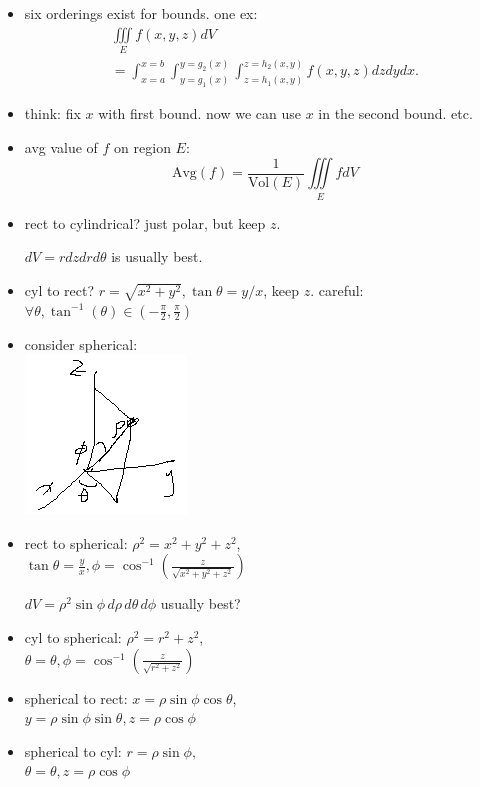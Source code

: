 \documentclass[11pt]{article}
\theoremstyle{definition}
\begin{document}
\begin{multicols}{2}
{\begin{itemize}
      \item six orderings exist for bounds. one ex:
      \begin{gather*}
        \iiint\limits_E f(x,y,z)dV \\
        = \int_{x=a}^{x=b}\int_{y=g_1(x)}^{y=g_2(x)}\int_{z=h_1(x,y)}^{z=h_2(x,y)}f(x,y,z)dzdydx.
      \end{gather*}
      \item think: fix $x$ with first bound. now we can use $x$ in the second bound. etc.
      \item avg value of $f$ on region $E$:
      \[ \text{Avg}(f) = \frac{1}{\text{Vol}(E)}\iiint\limits_E f dV \]
      \item rect to cylindrical? just polar, but keep $z$.
      
      $dV = rdzdrd\theta$ is usually best. 
      \item cyl to rect? $r=\sqrt{x^2+y^2}, \tan\theta = y/x$, keep $z$. careful: $\forall \theta,\tan^{-1}(\theta)\in (-\frac{\pi}{2},\frac{\pi}{2})$
      \item consider spherical:\\
      \includegraphics{spherical_coords.png}
      \item rect to spherical: $\rho^2=x^2+y^2+z^2$,\\ $\tan\theta=\frac{y}{x},\phi=\cos^{-1}(\frac{z}{\sqrt{x^2+y^2+z^2}})$
      
      $dV=\rho^2\sin\phi \,d\rho \,d\theta \,d\phi$ usually best?
      \item cyl to spherical: $\rho^2 = r^2 + z^2$,\\ $\theta=\theta, \phi=\cos^{-1}(\frac{z}{\sqrt{r^2+z^2}})$
      \item spherical to rect: $x=\rho\sin\phi\cos\theta$, \\$y=\rho\sin\phi\sin\theta,z=\rho\cos\phi$
      \item spherical to cyl: $r=\rho\sin\phi,$\\$\theta=\theta,z=\rho\cos\phi$
    \end{itemize}
  }
\end{multicols}
  
\end{document}
